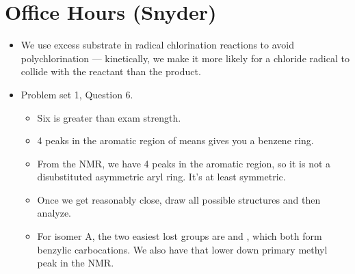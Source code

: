 \documentclass[../notes.tex]{subfiles}
\begin{document}
\section{Office Hours (Snyder)}
\begin{itemize}
    \item {}We use excess substrate in radical chlorination reactions to avoid polychlorination --- kinetically, we make it more likely for a chloride radical to collide with the reactant than the product.
    \item Problem set 1, Question 6.
    \begin{itemize}
        \item Six is greater than exam strength.
        \item 4 peaks in the aromatic region of  means gives you a benzene ring.
        \item From the  NMR, we have 4 peaks in the aromatic region, so it is not a disubstituted asymmetric aryl ring. It's at least symmetric.
        \item Once we get reasonably close, draw all possible structures and then analyze.
        \item For isomer A, the two easiest lost groups are  and , which both form benzylic carbocations. We also have that lower down primary methyl peak in the  NMR.
    \end{itemize}
\end{itemize}
\end{document}

